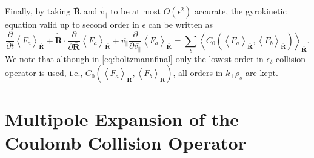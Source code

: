%
Finally, by taking $\dot{\overline {\mathbf R}}$ and $\dot{\overline {v_\parallel}}$ to be at most $O(\epsilon^2)$ accurate, the gyrokinetic equation valid up to second order in $\epsilon$ can be written as
%
\begin{equation}
    \frac{\partial}{\partial t}\left< \overline{F_a} \right>_{\overline{\mathbf{R}}} + \dot{\overline {\mathbf R}} \cdot \frac{\partial }{\partial \overline {\mathbf R}}\left<\overline{F_a}\right>_{\overline{\mathbf{R}}}+ \dot{\overline {v_\parallel}} \frac{\partial}{\partial \overline {v_\parallel}}\left<\overline{F_a}\right>_{\overline{\mathbf{R}}} = \sum_b \left< C_0(\left<\overline{F_a}\right>_{\overline{\mathbf{R}}},\left<\overline{F_b}\right>_{\overline{\mathbf{R}}})\right>_{\overline{\mathbf{R}}}.
\label{eq:boltzmannfinal}
\end{equation}
%
We note that although in \cref{eq:boltzmannfinal} only the lowest order in $\epsilon_\delta$ collision operator is used, i.e., $C_0(\left<\overline{F_a}\right>_{\overline{\mathbf{R}}},\left<\overline{F_b}\right>_{\overline{\mathbf{R}}})$, all orders in $k_\perp \rho_s$ are kept.

\section{Multipole Expansion of the Coulomb Collision Operator}
\label{sec:gcmodel}

